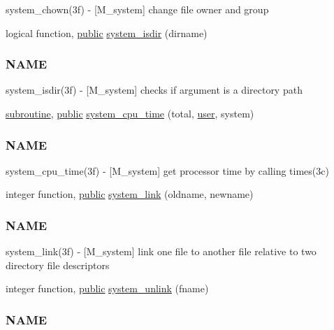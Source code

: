 \begin{DoxyCompactItemize}
\begin{DoxyCompactList}
system\+\_\+chown(3f) -\/ \mbox{[}M\+\_\+system\mbox{]} change file owner and group \end{DoxyCompactList}\item 
logical function, \hyperlink{M__stopwatch_83_8txt_a2f74811300c361e53b430611a7d1769f}{public} \hyperlink{namespacem__system_ad097988a031e64b4f21f856cf45c9c73}{system\+\_\+isdir} (dirname)
\begin{DoxyCompactList}\small\item\em \subsubsection*{N\+A\+ME}

system\+\_\+isdir(3f) -\/ \mbox{[}M\+\_\+system\mbox{]} checks if argument is a directory path \end{DoxyCompactList}\item 
\hyperlink{M__stopwatch_83_8txt_acfbcff50169d691ff02d4a123ed70482}{subroutine}, \hyperlink{M__stopwatch_83_8txt_a2f74811300c361e53b430611a7d1769f}{public} \hyperlink{namespacem__system_a257d2b8987db850bc686507f19ccbe4a}{system\+\_\+cpu\+\_\+time} (total, \hyperlink{M__stopwatch_83_8txt_ae5f4c36a1ae7eba7900823c418223f72}{user}, system)
\begin{DoxyCompactList}\small\item\em \subsubsection*{N\+A\+ME}

system\+\_\+cpu\+\_\+time(3f) -\/ \mbox{[}M\+\_\+system\mbox{]} get processor time by calling times(3c) \end{DoxyCompactList}\item 
integer function, \hyperlink{M__stopwatch_83_8txt_a2f74811300c361e53b430611a7d1769f}{public} \hyperlink{namespacem__system_aa77d9c9ae68750f515ba3d04d022c43c}{system\+\_\+link} (oldname, newname)
\begin{DoxyCompactList}\small\item\em \subsubsection*{N\+A\+ME}

system\+\_\+link(3f) -\/ \mbox{[}M\+\_\+system\mbox{]} link one file to another file relative to two directory file descriptors \end{DoxyCompactList}\item 
integer function, \hyperlink{M__stopwatch_83_8txt_a2f74811300c361e53b430611a7d1769f}{public} \hyperlink{namespacem__system_a14ce0b9177815bc357dbdf3778687bb7}{system\+\_\+unlink} (fname)
\begin{DoxyCompactList}\small\item\em \subsubsection*{N\+A\+ME}


\end{DoxyCompactList}
\end{DoxyCompactItemize}

